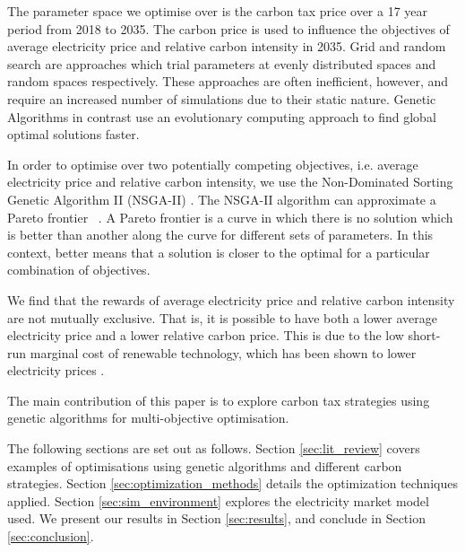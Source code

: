 \documentclass[sigconf]{acmart}
\begin{document}
The parameter space we optimise over is the carbon tax price over a 17 year period from 2018 to 2035. The carbon price is used to influence the objectives of average electricity price and relative carbon intensity in 2035. Grid and random search are approaches which trial parameters at evenly distributed spaces and random spaces respectively. These approaches are often inefficient, however, and require an increased number of simulations due to their static nature. Genetic Algorithms in contrast use an evolutionary computing approach to find global optimal solutions faster.


In order to optimise over two potentially competing objectives, i.e. average electricity price and relative carbon intensity, we use the Non-Dominated Sorting Genetic Algorithm II (NSGA-II) \cite{Valkanas2014}. The NSGA-II algorithm can approximate a Pareto frontier ~\cite{Pareto1927, Stadler1979}. A Pareto frontier is a curve in which there is no solution which is better than another along the curve for different sets of parameters. In this context, better means that a solution is closer to the optimal for a particular combination of objectives.

We find that the rewards of average electricity price and relative carbon intensity are not mutually exclusive. That is, it is possible to have both a lower average electricity price and a lower relative carbon price. This is due to the low short-run marginal cost of renewable technology, which has been shown to lower electricity prices \cite{OMahoney2011}.

The main contribution of this paper is to explore carbon tax strategies using genetic algorithms for multi-objective optimisation. 

The following sections are set out as follows. Section \ref{sec:lit_review} covers examples of optimisations using genetic algorithms and different carbon strategies. Section \ref{sec:optimization_methods} details the optimization techniques applied. Section \ref{sec:sim_environment} explores the electricity market model used. We present our results in Section \ref{sec:results}, and conclude in Section \ref{sec:conclusion}.
\end{document}
